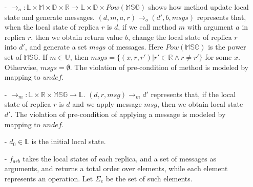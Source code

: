 \begin{itemize}
\setlength{\itemsep}{0.5pt}
\item[-] $\rightarrow_o: \mathbb{L} \times \mathbb{M} \times \mathbb{D} \times \mathbb{R} \rightarrow \mathbb{L} \times \mathbb{D} \times \mathit{Pow}(\mathbb{MSG})$ shows how method update local state and generate messages. $(d,m,a,r) \rightarrow_o (d',b,\mathit{msgs})$ represents that, when the local state of replica $r$ is $d$, if we call method $m$ with argument $a$ in replica $r$, then we obtain return value $b$, change the local state of replica $r$ into $d'$, and generate a set $\mathit{msgs}$ of messages. Here $\mathit{Pow}(\mathbb{MSG})$ is the power set of $\mathbb{MSG}$. If $m \in \mathbb{U}$, then $\mathit{msgs} = \{ (x,r,r') \vert r' \in \mathbb{R} \wedge r \neq r' \}$ for some $x$. Otherwise, $\mathit{msgs} = \emptyset$. {\color {red}The violation of pre-condition of method is modeled by mapping to $\mathit{undef}$.} 

\item[-] $\rightarrow_m: \mathbb{L} \times \mathbb{R} \times \mathbb{MSG} \rightarrow \mathbb{L}$. $(d,r,\mathit{msg}) \rightarrow_m d'$ represents that, if the local state of replica $r$ is $d$ and we apply message $\mathit{msg}$, then we obtain local state $d'$. {\color {red}The violation of pre-condition of applying a message is modeled by mapping to $\mathit{undef}$.} 

\item[-] $d_0 \in \mathbb{L}$ is the initial local state.

\item[-] $f_{\mathit{arb}}$ takes the local states of each replica, and a set of messages as arguments, and returns a total order over elements, while each element represents an operation. Let $\Sigma_e$ be the set of such elements. 
    


\end{itemize}


